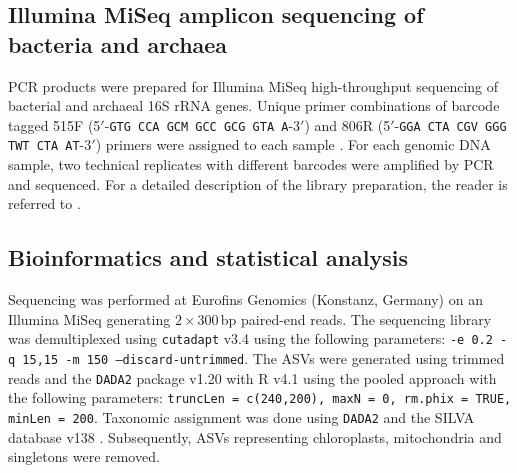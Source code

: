 \subsection{Illumina MiSeq amplicon sequencing of bacteria and archaea}

PCR products were prepared for Illumina MiSeq high-throughput sequencing of bacterial and archaeal 16S rRNA genes. Unique primer combinations of barcode tagged 515F (5\('\)-\texttt{GTG CCA GCM GCC GCG GTA A}-3\('\)) and 806R (5\('\)-\texttt{GGA CTA CGV GGG TWT CTA AT}-3\('\)) primers were assigned to each sample \citep{Caporaso2012}. For each genomic DNA sample, two technical replicates with different barcodes were amplified by PCR and sequenced. For a detailed description of the library preparation, the reader is referred to \citet{Moskwa2020}.

\subsection{Bioinformatics and statistical analysis}

Sequencing was performed at Eurofins Genomics (Konstanz, Germany) on an Illumina MiSeq generating \(2\times 300\)\,bp paired-end reads. The sequencing library was demultiplexed using \texttt{cutadapt} v3.4 \citep{Martin2011} using the following parameters: \texttt{-e 0.2 -q 15,15 -m 150 --discard-untrimmed}. The ASVs were generated using trimmed reads and the \texttt{DADA2} package v1.20 \citep{Callahan2016} with R v4.1 using the pooled approach with the following parameters: \texttt{truncLen = c(240,200), maxN = 0, rm.phix = TRUE, minLen = 200}. Taxonomic assignment was done using \texttt{DADA2} and the SILVA database v138 \citep{Quast2012}. 
Subsequently, ASVs representing chloroplasts, mitochondria and singletons were removed.

